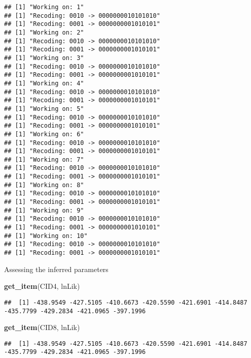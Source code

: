 \documentclass[
]{article}
\newenvironment{Shaded}{\begin{snugshade}}{\end{snugshade}}
\newcommand{\FunctionTok}[1]{\textcolor[rgb]{0.13,0.29,0.53}{\textbf{#1}}}
\newcommand{\NormalTok}[1]{#1}
\newcommand{\StringTok}[1]{\textcolor[rgb]{0.31,0.60,0.02}{#1}}
\begin{document}
\begin{verbatim}
## [1] "Working on: 1"
## [1] "Recoding: 0010 -> 0000000010101010"
## [1] "Recoding: 0001 -> 0000000001010101"
## [1] "Working on: 2"
## [1] "Recoding: 0010 -> 0000000010101010"
## [1] "Recoding: 0001 -> 0000000001010101"
## [1] "Working on: 3"
## [1] "Recoding: 0010 -> 0000000010101010"
## [1] "Recoding: 0001 -> 0000000001010101"
## [1] "Working on: 4"
## [1] "Recoding: 0010 -> 0000000010101010"
## [1] "Recoding: 0001 -> 0000000001010101"
## [1] "Working on: 5"
## [1] "Recoding: 0010 -> 0000000010101010"
## [1] "Recoding: 0001 -> 0000000001010101"
## [1] "Working on: 6"
## [1] "Recoding: 0010 -> 0000000010101010"
## [1] "Recoding: 0001 -> 0000000001010101"
## [1] "Working on: 7"
## [1] "Recoding: 0010 -> 0000000010101010"
## [1] "Recoding: 0001 -> 0000000001010101"
## [1] "Working on: 8"
## [1] "Recoding: 0010 -> 0000000010101010"
## [1] "Recoding: 0001 -> 0000000001010101"
## [1] "Working on: 9"
## [1] "Recoding: 0010 -> 0000000010101010"
## [1] "Recoding: 0001 -> 0000000001010101"
## [1] "Working on: 10"
## [1] "Recoding: 0010 -> 0000000010101010"
## [1] "Recoding: 0001 -> 0000000001010101"
\end{verbatim}

Assessing the inferred parameters

\begin{Shaded}
\begin{Highlighting}[]
\FunctionTok{get\_item}\NormalTok{(CID4, }\StringTok{\textquotesingle{}lnLik\textquotesingle{}}\NormalTok{)}
\end{Highlighting}
\end{Shaded}

\begin{verbatim}
##  [1] -438.9549 -427.5105 -410.6673 -420.5590 -421.6901 -414.8487 -435.7799 -429.2834 -421.0965 -397.1996
\end{verbatim}

\begin{Shaded}
\begin{Highlighting}[]
\FunctionTok{get\_item}\NormalTok{(CID8, }\StringTok{\textquotesingle{}lnLik\textquotesingle{}}\NormalTok{)}
\end{Highlighting}
\end{Shaded}

\begin{verbatim}
##  [1] -438.9549 -427.5105 -410.6673 -420.5590 -421.6901 -414.8487 -435.7799 -429.2834 -421.0965 -397.1996
\end{verbatim}
\end{document}
